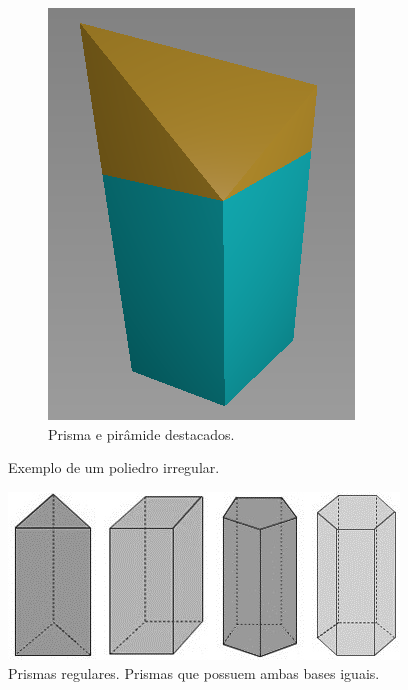 \begin{figure}[H]
\begin{subfigure}[t]{0.3\textwidth}
        \includegraphics[width=\textwidth]{dados/figuras/pol_sep.png}
        \caption{Prisma e pirâmide destacados.}
        \label{fig:polyhedron3}
    \end{subfigure}
    \caption{Exemplo de um poliedro irregular.}
    \label{fig:polyhedron}
\end{figure}

\begin{figure}[H]
    \centering
    \includegraphics[scale=0.8]{dados/figuras/regular_prisms.jpg}
    \caption{Prismas regulares. Prismas que possuem ambas bases iguais.}
    \label{fig:regular_prisms}
\end{figure}

